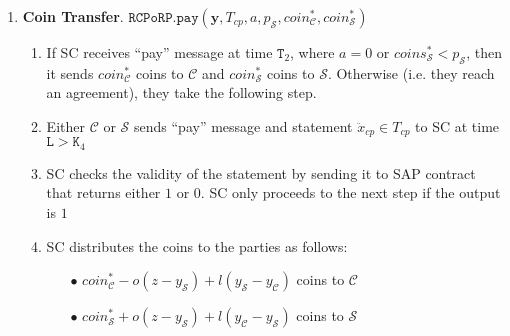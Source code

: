 \begin{enumerate}
\

\item \textbf{Coin Transfer}. \label{RCPoRP::CoinTransfer} $\mathtt{RCPoRP}.\mathtt{pay}(\bm{y},T_{\scriptscriptstyle cp},a,p_{\scriptscriptstyle\mathcal S}, coin^{\scriptscriptstyle *}_{\scriptscriptstyle\mathcal C},coin^{\scriptscriptstyle *}_{\scriptscriptstyle\mathcal S})$
\begin{enumerate}


 \item If SC  receives  ``pay'' message  at time $\texttt{T}_{\scriptscriptstyle 2}$, where $a=0$ or $coins^{\scriptscriptstyle *}_{\scriptscriptstyle\mathcal{S}}<p_{\scriptscriptstyle\mathcal{S}}$, then it sends $coin^{\scriptscriptstyle *}_{\scriptscriptstyle\mathcal C}$ coins to $\mathcal C$ and $coin^{\scriptscriptstyle *}_{\scriptscriptstyle\mathcal S}$ coins to $\mathcal S$. Otherwise (i.e. they reach an agreement), they take the following step. 

\item Either $\mathcal C$ or $\mathcal S$ sends ``pay'' message and  statement $\ddot{x}_{\scriptscriptstyle cp}\in T_{\scriptscriptstyle cp}$ to SC at time $\texttt{L}>\texttt{K}_{\scriptscriptstyle 4}$
\item SC checks the validity of the statement by sending it  to SAP contract that  returns  either $1$ or $0$. SC only proceeds to the next step if the output is $1$
\item SC distributes the coins to the parties as follows:

\begin{itemize}
\item[$\bullet$]   $coin^{\scriptscriptstyle *}_{\scriptscriptstyle\mathcal C}-o(z-y_{\scriptscriptstyle\mathcal S})+l(y_{\scriptscriptstyle\mathcal S}-y_{\scriptscriptstyle\mathcal C})$ coins  to $\mathcal C$

\item[$\bullet$] $coin^{\scriptscriptstyle *}_{\scriptscriptstyle\mathcal S}+o(z-y_{\scriptscriptstyle\mathcal S})+l( y_{\scriptscriptstyle\mathcal C}-y_{\scriptscriptstyle\mathcal S})$ coins to $\mathcal S$
\end{itemize}

\end{enumerate}
\end{enumerate}


